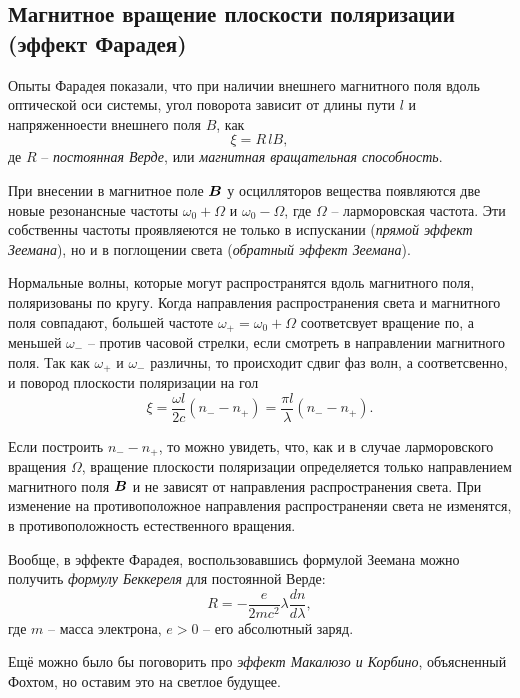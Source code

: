 \subsection{Магнитное вращение плоскости поляризации (эффект Фарадея)}

Опыты Фарадея показали, что при наличии внешнего магнитного поля вдоль оптической оси системы, угол поворота зависит от длины пути $l$ и напряженноести внешнего поля $B$, как
\begin{equation*}
    \xi = R\, l B,
\end{equation*}
де $R$ -- \textit{постоянная Верде}, или \textit{магнитная вращательная способность}. 

При внесении в магнитное поле $\mbox{\boldmath $B$}$ у осцилляторов вещества появляются две новые резонансные частоты $\omega_0 + \Omega$ и $\omega_0 - \Omega$, где $\Omega$ -- ларморовская частота. Эти собственны частоты проявляеются не только в испускании (\textit{прямой эффект Зеемана}), но и в поглощении света (\textit{обратный эффект Зеемана}). 

Нормальные волны, которые могут распространятся вдоль магнитного поля, поляризованы по кругу. Когда направления распространения света и магнитного поля совпадают, большей частоте $\omega_+ = \omega_0 + \Omega$ соответсвует вращение по, а меньшей $\omega_-$ -- против часовой стрелки, если смотреть в направлении магнитного поля. Так как $\omega_+$ и $\omega_-$ различны, то происходит сдвиг фаз волн, а соответсвенно, и повород плоскости поляризации на гол
\begin{equation*}
    \xi = \frac{\omega l}{2c} (n_- - n_+) = \frac{\pi l}{\lambda} (n_- - n_+).
\end{equation*}

Если построить $n_- - n_+$, то можно увидеть, что, как и в случае ларморовского вращения $\Omega$, вращение плоскости поляризации определяется только направлением магнитного поля $\mbox{\boldmath $B$}$ и не зависят от направления распространения света.  При изменение на противоположное направления распространеняи света не изменятся, в противоположность естественного вращения. 

Вообще, в эффекте Фарадея, воспользовавшись формулой Зеемана можно получить \textit{формулу Беккереля} для постоянной Верде:
\begin{equation*}
    R = - \frac{e}{2 mc^2} \lambda \frac{d n}{d \lambda},
\end{equation*}
где $m$ -- масса электрона, $e > 0$ -- его абсолютный заряд.  


Ещё можно было бы поговорить про \textit{эффект Макалюзо и Корбино}, объясненный Фохтом, но оставим это на светлое будущее. 



